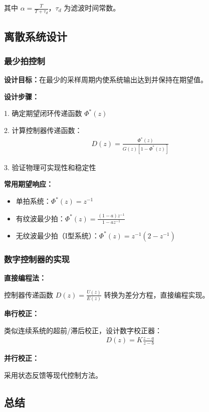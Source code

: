 其中 $\alpha = \frac{T}{T + \tau_d}$，$\tau_d$ 为滤波时间常数。

\subsection{离散系统设计}

\subsubsection{最少拍控制}

\textbf{设计目标：}在最少的采样周期内使系统输出达到并保持在期望值。

\textbf{设计步骤：}

1. 确定期望闭环传递函数 $\Phi^*(z)$

2. 计算控制器传递函数：
\begin{align*}
D(z) = \frac{\Phi^*(z)}{G(z)[1-\Phi^*(z)]}
\end{align*}

3. 验证物理可实现性和稳定性

\textbf{常用期望响应：}
\begin{itemize}
    \item 单拍系统：$\Phi^*(z) = z^{-1}$
    \item 有纹波最少拍：$\Phi^*(z) = \frac{(1-a)z^{-1}}{1-az^{-1}}$
    \item 无纹波最少拍（I型系统）：$\Phi^*(z) = z^{-1}(2-z^{-1})$
\end{itemize}

\subsubsection{数字控制器的实现}

\textbf{直接编程法：}

控制器传递函数 $D(z) = \frac{U(z)}{E(z)}$ 转换为差分方程，直接编程实现。

\textbf{串行校正：}

类似连续系统的超前/滞后校正，设计数字校正器：
\begin{align*}
D(z) = K \frac{z - a}{z - b}
\end{align*}

\textbf{并行校正：}

采用状态反馈等现代控制方法。

\subsection{总结}

